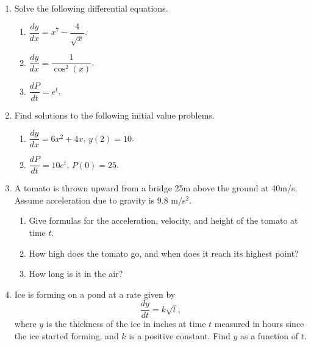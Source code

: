 \documentclass[11pt]{article}
\begin{document}
\drawtitle

\begin{enumerate}

\item Solve the following differential equations.
  \begin{enumerate}
  \item $\dfrac{dy}{dx} = x^7-\dfrac{4}{\sqrt{x}}$.
    \vfill
  \item $\dfrac{dy}{dx} = \dfrac{1}{\cos^2(x)}$.
    \vfill
  \item $\dfrac{dP}{dt} = e^t$.
    \vfill
  \end{enumerate}

  \newpage
  
\item Find solutions to the following initial value problems.
  \begin{enumerate}
  \item $\dfrac{dy}{dx}=6x^2+4x$, $y(2)=10$.
    \vfill
  \item $\dfrac{dP}{dt}=10e^t$, $P(0)=25$.
    \vfill
  \end{enumerate}

  \newpage

\item A tomato is thrown upward from a bridge 25m above the ground at
  40m/s.  Assume acceleration due to gravity is $9.8$ m/s$^2$.
  \begin{enumerate}
  \item Give formulas for the acceleration, velocity, and height of
    the tomato at time $t$.

    \vfill
    
  \item How high does the tomato go, and when does it reach its
    highest point?

    \vfill
    
  \item How long is it in the air?

    \vfill
    
  \end{enumerate}

  \newpage

\item Ice is forming on a pond at a rate given by
  \[
  \frac{dy}{dt}=k\sqrt{t},
  \]
  where $y$ is the thickness of the ice in inches at time $t$ measured
  in hours since the ice started forming, and $k$ is a positive
  constant.  Find $y$ as a function of $t$.

  \vfill


\end{enumerate}
\end{document}
